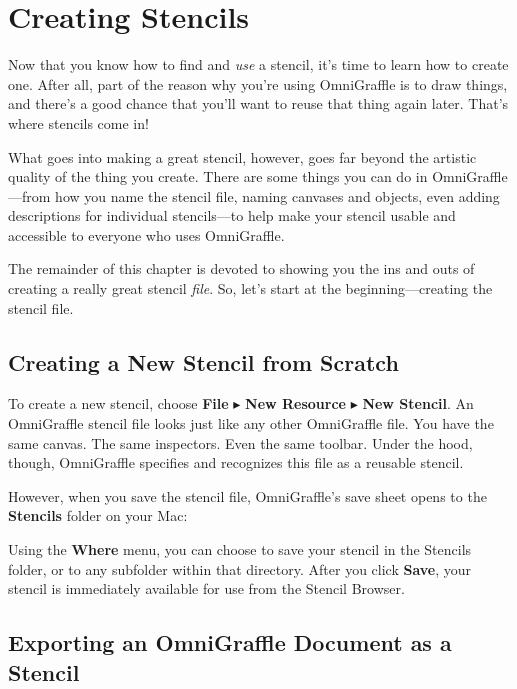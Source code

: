 \documentclass[../main.tex]{subfiles}
\begin{document}
\section{Creating Stencils}

Now that you know how to find and \textit{use} a stencil, it's time to learn how to create one.
After all, part of the reason why you're using OmniGraffle is to draw things, and there's a
good chance that you'll want to reuse that thing again later. That's where stencils come in!

What goes into making a great stencil, however, goes far beyond the artistic quality of the
thing you create. There are some things you can do in OmniGraffle---from how you name the
stencil file, naming canvases and objects, even adding descriptions for individual
stencils---to help make your stencil usable and accessible to everyone who uses OmniGraffle.

The remainder of this chapter is devoted to showing you the ins and outs of creating a really
great stencil \textit{file}. So, let's start at the beginning---creating the stencil file.

\subsection{Creating a New Stencil from Scratch}

To create a new stencil, choose \textbf{File} $\blacktriangleright$ \textbf{New Resource}
$\blacktriangleright$ \textbf{New Stencil}. An OmniGraffle stencil file looks just like any
other OmniGraffle file. You have the same canvas. The same inspectors. Even the same toolbar.
Under the hood, though, OmniGraffle specifies and recognizes this file as a reusable stencil.

However, when you save the stencil file, OmniGraffle's save sheet opens to the \textbf{Stencils}
folder on your Mac:


Using the \textbf{Where} menu, you can choose to save your stencil in the Stencils folder, or to
any subfolder within that directory. After you click \textbf{Save}, your stencil is
immediately available for use from the Stencil Browser.


\subsection{Exporting an OmniGraffle Document as a Stencil}
\end{document}
